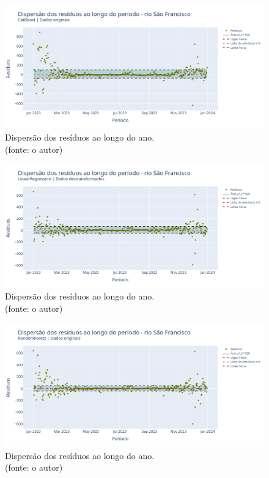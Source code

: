 \begin{figure}[!h]
\centering
\includegraphics[scale=0.33]{Figuras/rio_sao_francisco/wfv/CB/CB_WFV_ORIG_RESID_x_TEMPO.png}
\caption{Dispersão dos resíduos ao longo do ano.\\(fonte: o autor)}
\label{fig:francisco_CB_WFV_ORIG_RESID_x_TEMPO}
\end{figure}

\begin{figure}[!h]
\centering
\includegraphics[scale=0.33]{Figuras/rio_sao_francisco/wfv/LR/LR_WFV_LOG_RESID_x_TEMPO.png}
\caption{Dispersão dos resíduos ao longo do ano.\\(fonte: o autor)}
\label{fig:francisco_LR_WFV_LOG_RESID_x_TEMPO}
\end{figure}

\begin{figure}[!h]
\centering
\includegraphics[scale=0.33]{Figuras/rio_sao_francisco/wfv/RF/RF_WFV_ORIG_RESID_x_TEMPO.png}
\caption{Dispersão dos resíduos ao longo do ano.\\(fonte: o autor)}
\label{fig:francisco_RF_WFV_ORIG_RESID_x_TEMPO}
\end{figure}
\clearpage


